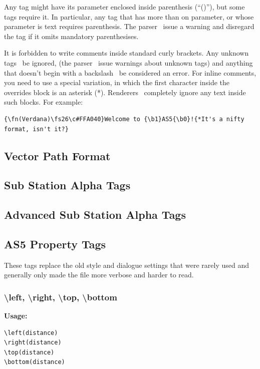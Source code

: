\documentclass{spec}
\begin{document}
Any tag might have its parameter enclosed inside parenthesis (``()''), but some tags require it. In
particular, any tag that has more than on parameter, or whose parameter is text requires parenthesis.
The parser \must\ issue a warning and disregard the tag if it omits mandatory parenthesises.

It is forbidden to write comments inside standard curly brackets. Any unknown tags \must\ be ignored,
(the parser \should\ issue warnings about unknown tags) and anything that doesn't begin with a backslash
\must\ be considered an error. For inline comments, you need to use a special variation, in which the
first character inside the overrides block is an asterisk (*). Renderers \must\ completely ignore
any text inside such blocks. For example:

\begin{verbatim}
{\fn(Verdana)\fs26\c#FFA040}Welcome to {\b1}AS5{\b0}!{*It's a nifty format, isn't it?}
\end{verbatim}


\subsection{Vector Path Format}


\subsection{Sub Station Alpha Tags}


\subsection{Advanced Sub Station Alpha Tags}


\subsection{AS5 Property Tags}
These tags replace the old style and dialogue settings that were rarely used and generally only
made the file more verbose and harder to read.

\subsubsection{\textbackslash left, \textbackslash right, \textbackslash top, \textbackslash bottom}
\textbf{Usage:}
\begin{verbatim}
\left(distance)
\right(distance)
\top(distance)
\bottom(distance)
\end{verbatim}
\end{document}
